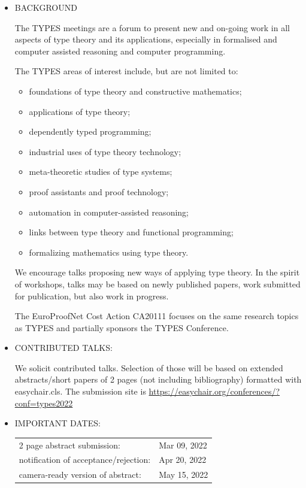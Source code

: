 \documentclass[prodmode,acmtecs]{acmsmall} %
\begin{document}
\begin{itemize}\item  BACKGROUND 
 
  The TYPES meetings are a forum to present new and on-going work in all aspects of type theory and its applications, especially in formalised and computer assisted reasoning and computer programming. 
 
  The TYPES areas of interest include, but are not limited to: 
 
\begin{itemize}\item  foundations of type theory and constructive mathematics;
\item  applications of type theory;
\item  dependently typed programming;
\item  industrial uses of type theory technology;
\item  meta-theoretic studies of type systems;
\item  proof assistants and proof technology;
\item  automation in computer-assisted reasoning;
\item  links between type theory and functional programming;
\item  formalizing mathematics using type theory.
\end{itemize} 
  We encourage talks proposing new ways of applying type theory. In the spirit of workshops, talks may be based on newly published papers, work submitted for publication, but also work in progress. 
 
  The EuroProofNet Cost Action CA20111 focuses on the same research topics as TYPES and partially sponsors the TYPES Conference. 
 
\item  CONTRIBUTED TALKS: 
 
  We solicit contributed talks. Selection of those will be based on extended abstracts/short papers of 2 pages (not including bibliography) formatted with easychair.cls. The submission site is \href{https://easychair.org/conferences/?conf=types2022}{https://easychair.org/conferences/?conf=types2022} 
 
\item  IMPORTANT DATES: 
 
\begin{tabulary}{\linewidth}{LL}2 page abstract submission:  & Mar 09, 2022 \\
notification of acceptance/rejection:  & Apr 20, 2022 \\
camera-ready version of abstract:  & May 15, 2022 \\
\end{tabulary}
 

\end{itemize}
\end{document}
